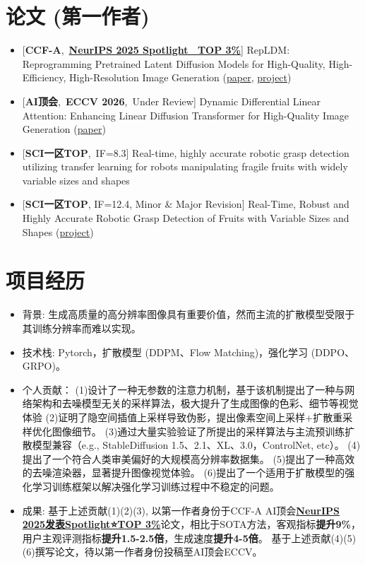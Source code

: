 \documentclass{resume}
\begin{document}
\section{论文 (第一作者)}
\begin{itemize}[parsep=\itemparsep]
  \item {}[\textbf{CCF-A},\ \underline{\textbf{NeurIPS 2025 Spotlight {\mdseries\faStar}\ TOP 3\%}}] RepLDM: Reprogramming Pretrained Latent Diffusion Models for High-Quality, High-Efficiency, High-Resolution Image Generation
  (\href{https://arxiv.org/abs/2410.06055}{paper}, \href{https://kmittle.github.io/project_pages/RepLDM}{project})
  \item {}[\textbf{AI顶会},\ \textbf{ECCV 2026},\ Under Review] Dynamic Differential Linear Attention: Enhancing Linear Diffusion Transformer for High-Quality Image Generation
  (\href{https://arxiv.org/abs/2601.13683}{paper})
  \item {}[\textbf{SCI一区TOP},\ IF=8.3] Real-time, highly accurate robotic grasp detection utilizing transfer learning for robots manipulating fragile fruits with widely variable sizes and shapes
  \item {}[\textbf{SCI一区TOP}, IF=12.4, Minor \& Major Revision] Real-Time, Robust and Highly Accurate Robotic Grasp Detection of Fruits with Variable Sizes and Shapes
  (\href{https://github.com/kmittle/Grasp-Detection-NBMOD}{project})
\end{itemize}


\section{项目经历}
\begin{itemize}[parsep=\itemparsep]
  \item 背景: 生成高质量的高分辨率图像具有重要价值，然而主流的扩散模型受限于其训练分辨率而难以实现。
  \item 技术栈: Pytorch，扩散模型 (DDPM、Flow Matching)，强化学习 (DDPO、GRPO)。
  \item 个人贡献：
  (1)设计了一种无参数的注意力机制，基于该机制提出了一种与网络架构和去噪模型无关的采样算法，极大提升了生成图像的色彩、细节等视觉体验
  (2)证明了隐空间插值上采样导致伪影，提出像素空间上采样+扩散重采样优化图像细节。
  (3)通过大量实验验证了所提出的采样算法与主流预训练扩散模型兼容（e.g., StableDiffusion 1.5、2.1、XL、3.0，ControlNet, etc）。
  (4)提出了一个符合人类审美偏好的大规模高分辨率数据集。
  (5)提出了一种高效的去噪渲染器，显著提升图像视觉体验。
  (6)提出了一个适用于扩散模型的强化学习训练框架以解决强化学习训练过程中不稳定的问题。
  \item 成果: 基于上述贡献(1)(2)(3), 以第一作者身份于CCF-A AI顶会\underline{\textbf{NeurIPS 2025发表Spotlight⭐TOP 3\%}}论文，相比于SOTA方法，客观指标\textbf{提升9\%}，用户主观评测指标\textbf{提升1.5-2.5倍}，生成速度\textbf{提升4-5倍}。
  基于上述贡献(4)(5)(6)撰写论文，待以第一作者身份投稿至AI顶会ECCV。
\end{itemize}
\end{document}
